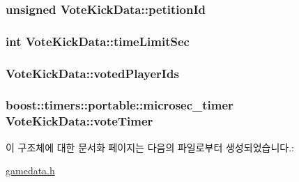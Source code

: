 \hypertarget{struct_vote_kick_data_a8deeb29aef91634e9082ca4f79780aa9}{
\subsubsection[{petition\-Id}]{\setlength{\rightskip}{0pt plus 5cm}unsigned Vote\-Kick\-Data\-::petition\-Id}}\label{struct_vote_kick_data_a8deeb29aef91634e9082ca4f79780aa9}
\hypertarget{struct_vote_kick_data_a79e16bf0cf655c6de32eb21beecaf3bf}{
\subsubsection[{time\-Limit\-Sec}]{\setlength{\rightskip}{0pt plus 5cm}int Vote\-Kick\-Data\-::time\-Limit\-Sec}}\label{struct_vote_kick_data_a79e16bf0cf655c6de32eb21beecaf3bf}
\hypertarget{struct_vote_kick_data_a68bb6a654755d931a50e4bc8ec27a67b}{
\subsubsection[{voted\-Player\-Ids}]{ Vote\-Kick\-Data\-::voted\-Player\-Ids}}\label{struct_vote_kick_data_a68bb6a654755d931a50e4bc8ec27a67b}
\hypertarget{struct_vote_kick_data_a0a4074bb3ceb4760b27403e1fd67c45d}{
\subsubsection[{vote\-Timer}]{\setlength{\rightskip}{0pt plus 5cm}boost\-::timers\-::portable\-::microsec\-\_\-timer Vote\-Kick\-Data\-::vote\-Timer}}\label{struct_vote_kick_data_a0a4074bb3ceb4760b27403e1fd67c45d}


이 구조체에 대한 문서화 페이지는 다음의 파일로부터 생성되었습니다.\-:\begin{DoxyCompactItemize}
\item 
\hyperlink{gamedata_8h}{gamedata.\-h}\end{DoxyCompactItemize}

